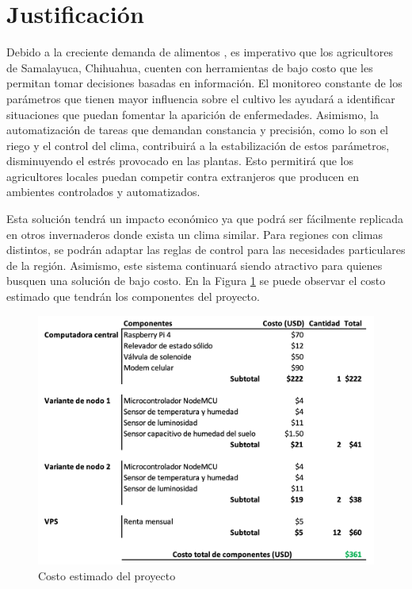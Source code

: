 \section{Justificación}


Debido a la creciente demanda de alimentos \cite{wik_pingali_brocai_2008}, es imperativo que los agricultores de Samalayuca, Chihuahua, cuenten con herramientas de bajo costo que les permitan tomar decisiones basadas en información. El monitoreo constante de los parámetros que tienen mayor influencia sobre el cultivo les ayudará a identificar situaciones que puedan fomentar la aparición de enfermedades. Asimismo, la automatización de tareas que demandan constancia y precisión, como lo son el riego y el control del clima, contribuirá a la estabilización de estos parámetros, disminuyendo el estrés provocado en las plantas. Esto permitirá que los agricultores locales puedan competir contra extranjeros que producen en ambientes controlados y automatizados. 

Esta solución tendrá un impacto económico ya que podrá ser fácilmente replicada en otros invernaderos donde exista un clima similar. Para regiones con climas distintos, se podrán adaptar las reglas de control para las necesidades particulares de la región. Asimismo, este sistema continuará siendo atractivo para quienes busquen una solución de bajo costo. En la Figura \ref{fig:costo_estimado} se puede observar el costo estimado que tendrán los componentes del proyecto.


\begin{figure}[!ht]
    \centering
    \includegraphics[width=1\linewidth]{imagenes/costo_estimado_proyecto.png}
    \caption{Costo estimado del proyecto }
    \label{fig:costo_estimado}
\end{figure}



